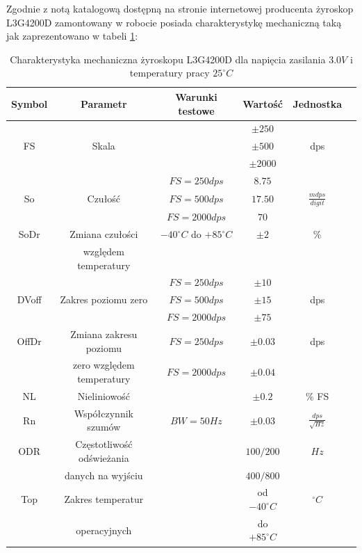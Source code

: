 Zgodnie z notą katalogową\cite{L3G4200DDataSheet} dostępną na stronie
internetowej producenta żyroskop L3G4200D zamontowany w robocie posiada
charakterystykę mechaniczną taką jak zaprezentowano w tabeli
\ref{tab:L3G4200DMechChar}:

\begin{table}[hb]
\centering
\caption{Charakterystyka mechaniczna żyroskopu L3G4200D dla napięcia zasilania
$3.0 V$ i temperatury pracy $25^{\circ}C$}
 \begin{tabular}{ | c | c | c | c | c | p{1.75cm} |} \hline
   		Symbol & Parametr & Warunki testowe & Wartość & Jednostka \\ \hline
   		& & & $\pm 250$ & \\
   		FS & Skala & & $\pm 500$ & dps\\
   		& & & $\pm 2000$ & \\ \hline
   		& & $FS = 250 dps$  & $8.75$  & \\
   		So  & Czułość & $FS = 500 dps$ & $17.50$  & $\frac{mdps}{digit}$ \\
   		& & $FS = 2000 dps$  & $70$  & \\ \hline
   		SoDr & Zmiana czułości & $-40^{\circ}C$ do $+85^{\circ}C$ & $\pm 2$  & \% \\
		& względem temperatury & & &  \\ \hline
		& & $FS = 250 dps$ & $\pm 10$  &  \\
   		DVoff & Zakres poziomu zero & $FS = 500 dps$  & $\pm 15$ & dps \\
   		& & $FS = 2000 dps$ & $\pm 75$ & \\ \hline
   		OffDr & Zmiana zakresu poziomu & $FS = 250 dps$  & $\pm 0.03$ & dps \\
   		& zero względem temperatury & $FS = 2000 dps$ & $\pm 0.04$ & \\ \hline
		NL & Nieliniowość & & $\pm 0.2$ & \% FS \\ \hline
		Rn & Współczynnik szumów & $BW = 50 Hz$ & $\pm 0.03$ & $\frac{dps}{\sqrt{Hz}}$ \\ \hline
		ODR & Częstotliwość odświeżania & & $100/200$ & $Hz$ \\
		& danych na wyjściu & & $400/800$ & \\ \hline
		Top & Zakres temperatur & & od $-40^{\circ} C$& $^{\circ} C$ \\
		& operacyjnych & & do $+85^{\circ} C$ & \\ \hline
   	\end{tabular}
\label{tab:L3G4200DMechChar}
\end{table}
